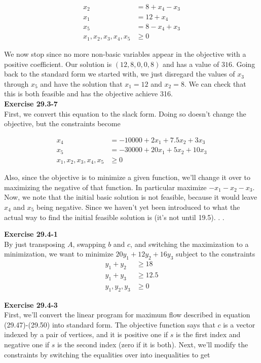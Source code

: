 \documentclass{article}
\begin{document}
\begin{align*}
x_2 & = 8+ x_4 - x_3\\
x_1 & = 12 + x_4 \\
x_5 & = 8 - x_4 + x_3\\
x_1,x_2,x_3,x_4,x_5 &\ge 0
\end{align*}

We now stop since no more non-basic variables appear in the objective with a positive coefficient. Our solution is $(12,8,0,0,8)$ and has a value of $316$. Going back to the standard form we started with, we just disregard the values of $x_3$ through $x_5$ and have the solution that $x_1 = 12$ and $x_2 = 8$. We can check that this is both feasible and has the objective achieve 316.\\


\noindent\textbf{Exercise 29.3-7}\\

First, we convert this equation to the slack form. Doing so doesn't change the objective, but the constraints become

\begin{align*}
x_4 & = -10000 + 2x_1 + 7.5x_2 + 3x_3\\
x_5 & = -30000 + 20x_1 + 5x_2 + 10x_3 \\
x_1,x_2,x_3,x_4,x_5 &\ge 0
\end{align*}

Also, since the objective is to minimize a given function, we'll change it over to maximizing the negative of that function. In particular maximize $-x_1 -x_2 -x_3$. Now, we note that the initial basic solution is not feasible, because it would leave $x_4$ and $x_5$ being negative. Since we haven't yet been introduced to what the actual way to find the initial feasible solution is (it's not until 19.5). . . 

\noindent\textbf{Exercise 29.4-1}\\
By just transposing $A$, swapping $b$ and $c$, and switching the maximization to a minimization, we want to minimize $20y_1 + 12 y_2 + 16 y_3$ subject to the constraints 
\begin{align*}
y_1 + y_2 &\ge 18\\
y_1 + y_3 &\ge 12.5\\
y_1,y_2,y_3 &\ge 0
\end{align*}


\noindent\textbf{Exercise 29.4-3}\\
First, we'll convert the linear program for maximum flow described in equation (29.47)-(29.50) into standard form. The objective function says that $c$ is a vector indexed by a pair of vertices, and it is positive one if $s$ is the first index and negative one if $s$ is the second index (zero if it is both). Next, we'll modify the constraints by switching the equalities over into inequalities to get
\end{document}
